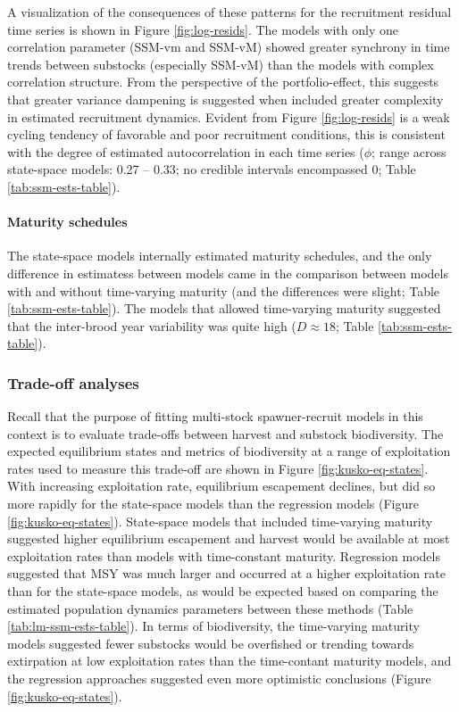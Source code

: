 \documentclass[12pt,]{book}
\let\oldparagraph\paragraph
\renewcommand{\paragraph}[1]{\oldparagraph{#1}\mbox{}}
\theoremstyle{definition}
\theoremstyle{definition}
\theoremstyle{definition}
\theoremstyle{remark}
\begin{document}
A visualization of the consequences of these patterns for the
recruitment residual time series is shown in Figure
\ref{fig:log-resids}. The models with only one correlation parameter
(SSM-vm and SSM-vM) showed greater synchrony in time trends between
substocks (especially SSM-vM) than the models with complex correlation
structure. From the perspective of the portfolio-effect, this suggests
that greater variance dampening is suggested when included greater
complexity in estimated recruitment dynamics. Evident from Figure
\ref{fig:log-resids} is a weak cycling tendency of favorable and poor
recruitment conditions, this is consistent with the degree of estimated
autocorrelation in each time series (\(\phi\); range across state-space
models: 0.27 -- 0.33; no credible intervals encompassed 0; Table
\ref{tab:ssm-ests-table}).

\paragraph{Maturity schedules}\label{maturity-schedules}

\noindent
The state-space models internally estimated maturity schedules, and the
only difference in estimatess between models came in the comparison
between models with and without time-varying maturity (and the
differences were slight; Table \ref{tab:ssm-ests-table}). The models
that allowed time-varying maturity suggested that the inter-brood year
variability was quite high (\(D \approx 18\); Table
\ref{tab:ssm-ests-table}).

\subsubsection{Trade-off analyses}\label{trade-off-analyses}

\noindent
Recall that the purpose of fitting multi-stock spawner-recruit models in
this context is to evaluate trade-offs between harvest and substock
biodiversity. The expected equilibrium states and metrics of
biodiversity at a range of exploitation rates used to measure this
trade-off are shown in Figure \ref{fig:kusko-eq-states}. With increasing
exploitation rate, equilibrium escapement declines, but did so more
rapidly for the state-space models than the regression models (Figure
\ref{fig:kusko-eq-states}). State-space models that included
time-varying maturity suggested higher equilibrium escapement and
harvest would be available at most exploitation rates than models with
time-constant maturity. Regression models suggested that MSY was much
larger and occurred at a higher exploitation rate than for the
state-space models, as would be expected based on comparing the
estimated population dynamics parameters between these methods (Table
\ref{tab:lm-ssm-ests-table}). In terms of biodiversity, the time-varying
maturity models suggested fewer substocks would be overfished or
trending towards extirpation at low exploitation rates than the
time-contant maturity models, and the regression approaches suggested
even more optimistic conclusions (Figure \ref{fig:kusko-eq-states}).
\end{document}
